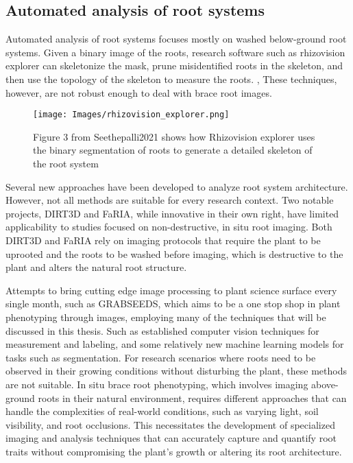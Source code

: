 \subsection{Automated analysis of root systems}
Automated analysis of root systems focuses mostly on washed below-ground root systems. Given a binary image of the roots, research software such as rhizovision explorer can skeletonize the mask, prune misidentified roots in the skeleton, and then use the topology of the skeleton to measure the roots. \cite{Seethepalli2021}, 
These techniques, however, are not robust enough to deal with brace root images. 
\begin{figure}[H]
    \centering
    \texttt{[image: Images/rhizovision\_explorer.png]}
    \caption{Figure 3 from Seethepalli2021 shows how Rhizovision explorer uses the binary segmentation of roots to generate a detailed skeleton of the root system}
    \label{fig:rhizovision}
\end{figure}








Several new approaches have been developed to analyze root system architecture. However, not all methods are suitable for every research context. Two notable projects, DIRT3D and FaRIA, while innovative in their own right, have limited applicability to studies focused on non-destructive, in situ root imaging. Both DIRT3D and FaRIA rely on imaging protocols that require the plant to be uprooted and the roots to be washed before imaging, which is destructive to the plant and alters the natural root structure.\cite{DIRT3D}\cite{FaRIA}

Attempts to bring cutting edge image processing to plant science surface every single month, such as GRABSEEDS\cite{Tang2024}, which aims to be a one stop shop in plant phenotyping through images, employing many of the techniques that will be discussed in this thesis. Such as established computer vision techniques for measurement and labeling, and some relatively new machine learning models for tasks such as segmentation. 
For research scenarios where roots need to be observed in their growing conditions without disturbing the plant, these methods are not suitable. In situ brace root phenotyping, which involves imaging above-ground roots in their natural environment, requires different approaches that can handle the complexities of real-world conditions, such as varying light, soil visibility, and root occlusions. This necessitates the development of specialized imaging and analysis techniques that can accurately capture and quantify root traits without compromising the plant's growth or altering its root architecture.

